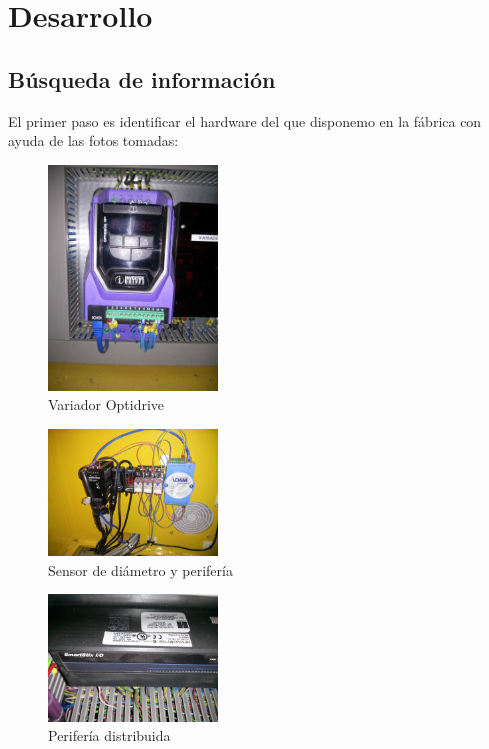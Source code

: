 \chapter{Desarrollo}
\label{hardware}

\section{Búsqueda de información}
\label{busqueda_informacion}

El primer paso es identificar el hardware del que disponemo en la fábrica con ayuda de las fotos tomadas:
    \begin{figure}[H]
            \centering
            \includegraphics[width=0.4\textwidth]{images/huesca/IMG_20141216_174810.jpg}
            \caption{Variador Optidrive}
            \label{fig:hardware_variador}
    \end{figure}

    \begin{figure}[H]
            \centering
            \includegraphics[width=0.4\textwidth]{images/huesca/IMG_20141216_174824.jpg}
            \caption{Sensor de diámetro y perifería}
            \label{fig:hardware_diametro}
    \end{figure}

    \begin{figure}[H]
            \centering
            \includegraphics[width=0.4\textwidth]{images/huesca/IMG_20141216_174925.jpg}
            \caption{Perifería distribuida}
            \label{fig:hardware_periferia}
    \end{figure}

